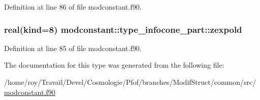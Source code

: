 Definition at line 86 of file modconstant.\-f90.

\hypertarget{structmodconstant_1_1type__infocone__part_a6bc976cbbe5cd3d696c2c9d0b5095c70}{
\subsubsection[{zexpold}]{\setlength{\rightskip}{0pt plus 5cm}real(kind=8) modconstant\-::type\-\_\-infocone\-\_\-part\-::zexpold}}\label{structmodconstant_1_1type__infocone__part_a6bc976cbbe5cd3d696c2c9d0b5095c70}


Definition at line 85 of file modconstant.\-f90.



The documentation for this type was generated from the following file\-:\begin{DoxyCompactItemize}
\item 
/home/roy/\-Travail/\-Devel/\-Cosmologie/\-Pfof/branches/\-Modif\-Struct/common/src/\hyperlink{modconstant_8f90}{modconstant.\-f90}\end{DoxyCompactItemize}
